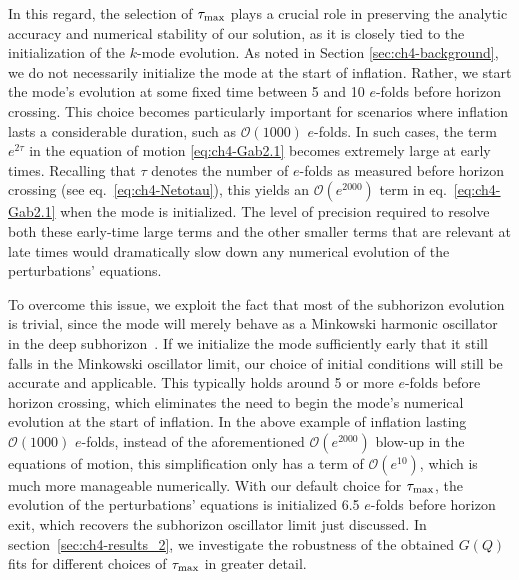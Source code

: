 In this regard, the selection of $\tau_{\rm{max}}$ plays a crucial role in preserving the analytic accuracy and numerical stability of our solution, as it is closely tied to the initialization of the $k$-mode evolution. As noted in Section \ref{sec:ch4-background}, we do not necessarily initialize the mode at the start of inflation. Rather, we start the mode's evolution at some fixed time between 5 and 10 $e$-folds before horizon crossing. This choice becomes particularly important for scenarios where inflation lasts a considerable duration, such as $\mathcal{O}(1000)$ $e$-folds. In such cases, the term $e^{2\tau}$ in the equation of motion \eqref{eq:ch4-Gab2.1} becomes extremely large at early times. Recalling that $\tau$ denotes the number of $e$-folds as measured before horizon crossing (see eq.~\eqref{eq:ch4-Netotau}), this yields an $\mathcal{O}(e^{2000})$ term in eq.~\eqref{eq:ch4-Gab2.1} when the mode is initialized. The level of precision required to resolve both these early-time large terms and the other smaller terms that are relevant at late times would dramatically slow down any numerical evolution of the perturbations' equations.

To overcome this issue, we exploit the fact that most of the subhorizon evolution is trivial, since the mode will merely behave as a Minkowski harmonic oscillator in the deep subhorizon~\cite{Weinberg:2008zzc}. If we initialize the mode sufficiently early that it still falls in the Minkowski oscillator limit, our choice of initial conditions will still be accurate and applicable. This typically holds around 5 or more $e$-folds before horizon crossing, which eliminates the need to begin the mode's numerical evolution at the start of inflation. In the above example of inflation lasting $\mathcal{O}(1000)$ $e$-folds, instead of the aforementioned $\mathcal{O}(e^{2000})$ blow-up in the equations of motion, this simplification only has a term of $\mathcal{O}(e^{10})$, which is much more manageable numerically.
With our default choice for $\tau_{\rm{max}}$, the evolution of the perturbations' equations is initialized 6.5 $e$-folds before horizon exit, which recovers the subhorizon oscillator limit just discussed. In section~\ref{sec:ch4-results_2}, we investigate the robustness of the obtained $G(Q)$ fits for different choices of $\tau_{\rm{max}}$ in greater detail.

